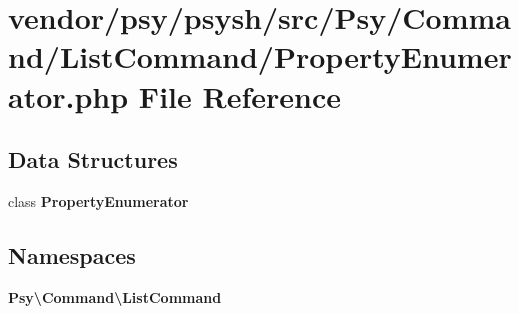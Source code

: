 \section{vendor/psy/psysh/src/\+Psy/\+Command/\+List\+Command/\+Property\+Enumerator.php File Reference}
\label{_property_enumerator_8php}
\subsection*{Data Structures}
\begin{DoxyCompactItemize}
\item 
class {\bf Property\+Enumerator}
\end{DoxyCompactItemize}
\subsection*{Namespaces}
\begin{DoxyCompactItemize}
\item 
 {\bf Psy\textbackslash{}\+Command\textbackslash{}\+List\+Command}
\end{DoxyCompactItemize}
